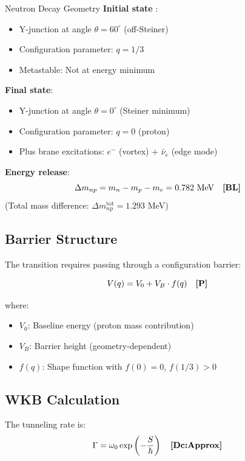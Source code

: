 \begin{mechanism}{Neutron Decay Geometry}
\textbf{Initial state} \tagP{}:
\begin{itemize}[nosep]
\item Y-junction at angle $\theta = 60^\circ$ (off-Steiner)
\item Configuration parameter: $q = 1/3$
\item Metastable: Not at energy minimum
\end{itemize}

\textbf{Final state}:
\begin{itemize}[nosep]
\item Y-junction at angle $\theta = 0^\circ$ (Steiner minimum)
\item Configuration parameter: $q = 0$ (proton)
\item Plus brane excitations: $e^-$ (vortex) + $\bar{\nu}_e$ (edge mode)
\end{itemize}

\textbf{Energy release}:
\begin{equation}
\Delta m_{np} = m_n - m_p - m_e = 0.782 \text{ MeV} \quad \textbf{[BL]}
\end{equation}
(Total mass difference: $\Delta m_{np}^{\text{tot}} = 1.293$ MeV)
\end{mechanism}

\subsection{Barrier Structure}

The transition requires passing through a configuration barrier:

\begin{equation}
V(q) = V_0 + V_B \cdot f(q) \quad \textbf{[P]}
\end{equation}

where:
\begin{itemize}[nosep]
\item $V_0$: Baseline energy (proton mass contribution)
\item $V_B$: Barrier height (geometry-dependent)
\item $f(q)$: Shape function with $f(0) = 0$, $f(1/3) > 0$
\end{itemize}

\subsection{WKB Calculation}

The tunneling rate is:
\begin{equation}
\Gamma = \omega_0 \exp\left(-\frac{S}{\hbar}\right) \quad \textbf{[Dc:Approx]}
\end{equation}

